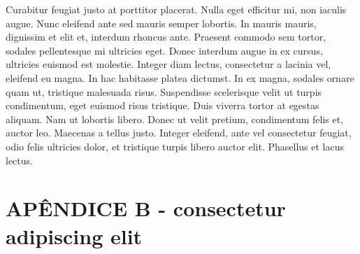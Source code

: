 	Curabitur feugiat justo at porttitor placerat. Nulla eget efficitur mi, non iaculis augue. Nunc eleifend ante sed mauris semper lobortis. In mauris mauris, dignissim et elit et, interdum rhoncus ante. Praesent commodo sem tortor, sodales pellentesque mi ultricies eget. Donec interdum augue in ex cursus, ultricies euismod est molestie. Integer diam lectus, consectetur a lacinia vel, eleifend eu magna. In hac habitasse platea dictumst. In ex magna, sodales ornare quam ut, tristique malesuada risus. Suspendisse scelerisque velit ut turpis condimentum, eget euismod risus tristique. Duis viverra tortor at egestas aliquam. Nam ut lobortis libero. Donec ut velit pretium, condimentum felis et, auctor leo. Maecenas a tellus justo. Integer eleifend, ante vel consectetur feugiat, odio felis ultricies dolor, et tristique turpis libero auctor elit. Phasellus et lacus lectus. 

\chapter*{APÊNDICE B - consectetur adipiscing elit}

	\renewcommand{\theintro}{B}
	\label{app:B}

